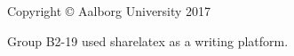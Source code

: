 \thispagestyle{empty}
{\small
\strut\vfill %
\noindent Copyright \copyright{} Aalborg University 2017\par
\vspace{0.2cm}
\noindent Group B2-19 used sharelatex as a writing platform. %
}
\clearpage
